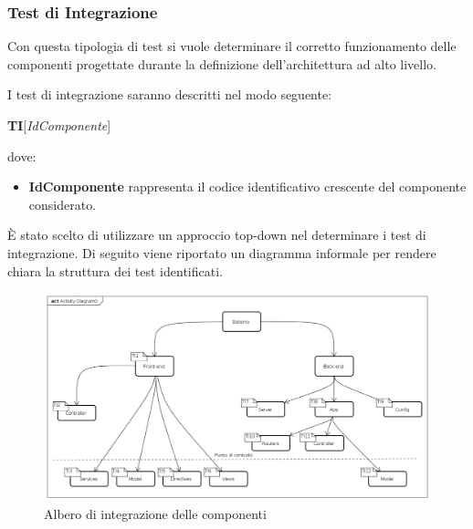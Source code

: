 \subsubsection{Test di Integrazione}
Con questa tipologia di test si vuole determinare il corretto funzionamento delle componenti progettate durante la definizione dell'architettura ad alto livello.

I test di integrazione saranno descritti nel modo seguente:
\begin{center}
\textbf{TI}[\textit{IdComponente}]
\end{center}
dove:
\begin{itemize}
\item
\textbf{IdComponente} rappresenta il codice identificativo crescente del componente considerato.
\end{itemize}
È stato scelto di utilizzare un approccio top-down nel determinare i test di integrazione. Di seguito viene riportato un diagramma informale per rendere chiara la struttura dei test identificati.
\begin{figure}[ht]
	\centering
	\includegraphics[scale=0.45]{AlberoDiIntegrazione.png}
	\caption{Albero di integrazione delle componenti}
\end{figure}
\FloatBarrier

